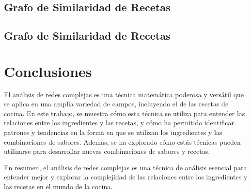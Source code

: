 \documentclass[a4paper]{article}
\begin{document}
\subsection{Grafo de Similaridad de Recetas}\label{sub:sim-graph}



\subsection{Grafo de Similaridad de Recetas}\label{sub:sim-graph}





\section{Conclusiones}\label{sec:conc}

El análisis de redes complejas es una técnica matemática poderosa y versátil que
se aplica en una amplia variedad de campos, incluyendo el de las recetas de
cocina. En este trabajo, se muestra cómo esta técnica se utiliza para entender
las relaciones entre los ingredientes y las recetas, y cómo ha permitido
identificar patrones y tendencias en la forma en que se utilizan los
ingredientes y las combinaciones de sabores. Además, se ha explorado cómo estás
técnicas pueden utilizarse para desarrollar nuevas combinaciones de sabores y
recetas.

En resumen, el análisis de redes complejas es una técnica de análisis esencial
para entender mejor y explorar la complejidad de las relaciones entre los
ingredientes y las recetas en el mundo de la cocina.




\end{document}
